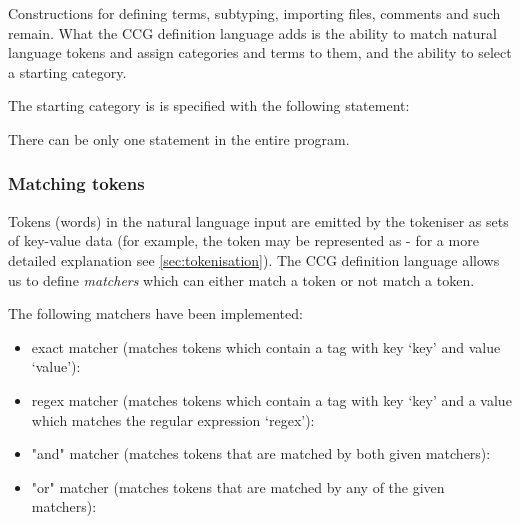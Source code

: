 \documentclass[main.tex]{subfiles}
\begin{document}
Constructions for defining terms, subtyping, importing files, comments and such
remain. What the CCG definition language adds is the ability to match natural
language tokens and assign categories and terms to them, and the ability to
select a starting category.

The starting category is is specified with the following statement:
\begin{center}
\end{center}
There can be only one  statement in the entire program.

\subsubsection{Matching tokens}
Tokens (words) in the natural language input are emitted by the
tokeniser as sets of
key-value data (for example, the token  may be represented as
 - for a more detailed explanation
see \cref{sec:tokenisation}). The CCG definition language allows us to define
\emph{matchers} which can either match a token or not match a token.

The following matchers have been implemented:

\begin{itemize}
    \item exact matcher (matches tokens which contain a tag with key `key'
        and value `value'):
        \begin{center}
        \end{center}
    \item regex matcher (matches tokens which contain a tag with key `key'
        and a value which matches the regular expression `regex'):
        \begin{center}
        \end{center}
    \item "and" matcher (matches tokens that are matched by both given matchers):
        \begin{center}
            \code{ \& }
        \end{center}
    \item "or" matcher (matches tokens that are matched by any of the given matchers):
        \begin{center}
            \code{ | }
        \end{center}
\end{itemize}
\end{document}
